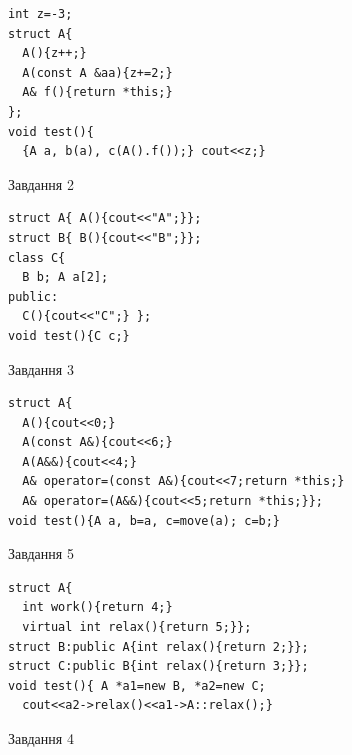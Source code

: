 \documentclass[12pt, ukrainian]{article}
\begin{document}
{{{{{{{{{{{{{{{{\begin{minipage}[t]{11cm}
\begin{verbatim}
int z=-3;
struct A{
  A(){z++;}
  A(const A &aa){z+=2;}
  A& f(){return *this;}
};
void test(){
  {A a, b(a), c(A().f());} cout<<z;}
\end{verbatim}            


               
{\begin{center}Завдання {2}\end{center}}
\vspace{-6mm}

\begin{verbatim}
struct A{ A(){cout<<"A";}};
struct B{ B(){cout<<"B";}};
class C{
  B b; A a[2];
public:
  C(){cout<<"C";} };
void test(){C c;}
\end{verbatim}            


               
{\begin{center}Завдання {3}\end{center}}
\vspace{-6mm}

\begin{verbatim}
struct A{
  A(){cout<<0;}
  A(const A&){cout<<6;}
  A(A&&){cout<<4;}
  A& operator=(const A&){cout<<7;return *this;}
  A& operator=(A&&){cout<<5;return *this;}};
void test(){A a, b=a, c=move(a); c=b;}
\end{verbatim}            


               
{\begin{center}Завдання {5}\end{center}}
\vspace{-6mm}

\begin{verbatim}
struct A{
  int work(){return 4;}
  virtual int relax(){return 5;}};
struct B:public A{int relax(){return 2;}};
struct C:public B{int relax(){return 3;}};
void test(){ A *a1=new B, *a2=new C;
  cout<<a2->relax()<<a1->A::relax();}
\end{verbatim}            


\end{minipage}
\vline \hspace{8mm}
\begin{minipage}[t]{7cm}
               
{\begin{center}Завдання {4}\end{center}}
\vspace{-6mm}


\end{minipage}}}}}}}}}}}}}}}}}
\end{document}
